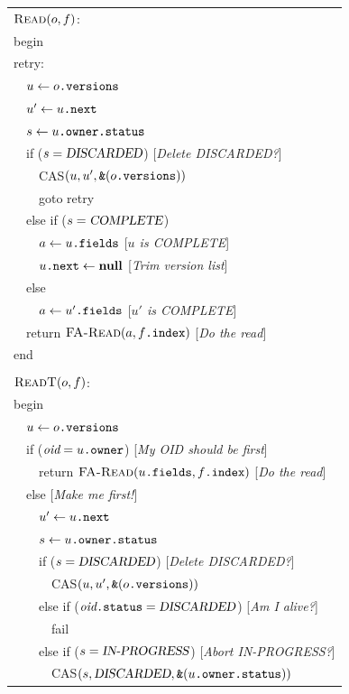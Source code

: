 \begin{figure}[p]
\sis%
\renewcommand{\>}{~~}%
\newcommand{\com}[1]{\hfill [{\sl #1}]}%
\begin{tabular}{l}%
$\text{\sc Read}(o, f)$:\\
begin\\
retry:\\
\>$u \gets o\text{\tt .versions}$ \\
\>$u' \gets u\text{\tt .next}$ \\
\>$s  \gets u\text{\tt .owner}\text{\tt .status}$ \\
\>if ($s=\text{\sl DISCARDED}$) \com{Delete DISCARDED?}\\
\>\>CAS$(u, u', \text{\tt \&}(o\text{\tt .versions}))$\\
\>\>goto retry \\
\>else if ($s=\text{\sl COMPLETE}$)\\
\>\>$a \gets u\text{\tt .fields}$ \com{$u$ is COMPLETE}\\
\>\>$u\text{\tt .next} \gets \text{\bf null}$ \com{Trim version list}\\
\>else\\
\>\>$a \gets u'\text{\tt .fields}$ \com{$u'$ is COMPLETE}\\
\>return $\text{\sc FA-Read}(a, f\text{\tt .index})$ \com{Do the read}\\
end\\
\\
$\text{\sc ReadT}(o, f)$:\\
begin\\
\>$u \gets o\text{\tt .versions}$\\
\>if ($\text{\it oid} = u\text{\tt .owner}$) \com{My OID should be first}\\
\>\>return $\text{\sc FA-Read}(u\text{\tt .fields}, f\text{\tt .index})$
\com{Do the read}\\
\>else \com{Make me first!}\\
\>\>$u' \gets u\text{\tt .next}$\\
\>\>$s  \gets u\text{\tt .owner}\text{\tt .status}$\\
\>\>if ($s=\text{\sl DISCARDED}$) \com{Delete DISCARDED?}\\
\>\>\>CAS$(u, u', \text{\tt \&}(o\text{\tt .versions}))$\\
\>\>else if ($\text{\it oid}\text{\tt .status}=\text{\sl DISCARDED}$)
\com{Am I alive?}\\
\>\>\>fail\\
\>\>else if ($s=\text{\sl IN-PROGRESS}$) \com{Abort IN-PROGRESS?}\\
\>\>\>CAS$(s, \text{\sl DISCARDED}, \text{\tt \&}(u\text{\tt .owner}\text{\tt .status}))$\\

\end{tabular}
\end{figure}
